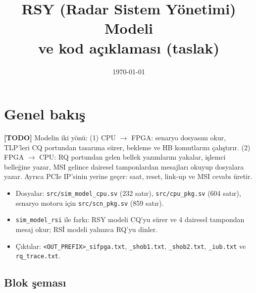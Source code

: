 \documentclass[11pt,a4paper]{article}
\title{\textbf{RSY (Radar Sistem Yönetimi) Modeli}\\[0.3em]
       \large \kod{sim\_model\_cpu.sv} ve \kod{cpu\_pkg.sv} kod açıklaması (taslak)}
\author{}
\date{\today}
\newcommand{\kod}[1]{\texttt{#1}}
\newcommand{\todo}[1]{\textcolor{red!60!black}{\textbf{[TODO]} #1}}
\begin{document}
\maketitle
\tableofcontents
\newpage

\section{Genel bakış}

\todo{Modelin iki yönü: (1) CPU $\to$ FPGA: senaryo dosyasını okur, TLP'leri CQ
portundan tasarıma sürer, bekleme ve HB komutlarını çalıştırır. (2) FPGA $\to$ CPU:
RQ portundan gelen bellek yazımlarını yakalar, işlemci belleğine yazar, MSI gelince
dairesel tamponlardan mesajları okuyup dosyalara yazar. Ayrıca PCIe IP'sinin yerine
geçer: saat, reset, link-up ve MSI cevabı üretir.}

\begin{itemize}[nosep]
  \item Dosyalar: \kod{src/sim\_model\_cpu.sv} (232 satır), \kod{src/cpu\_pkg.sv}
        (604 satır), senaryo motoru için \kod{src/scn\_pkg.sv} (859 satır).
  \item \kod{sim\_model\_rsi} ile farkı: RSY modeli CQ'yu sürer ve 4 dairesel tampondan
        mesaj okur; RSİ modeli yalnızca RQ'yu dinler.
  \item Çıktılar: \kod{<OUT\_PREFIX>\_sifpga.txt}, \kod{\_shob1.txt}, \kod{\_shob2.txt},
        \kod{\_iub.txt} ve \kod{rq\_trace.txt}.
\end{itemize}

\subsection{Blok şeması}
\end{document}
